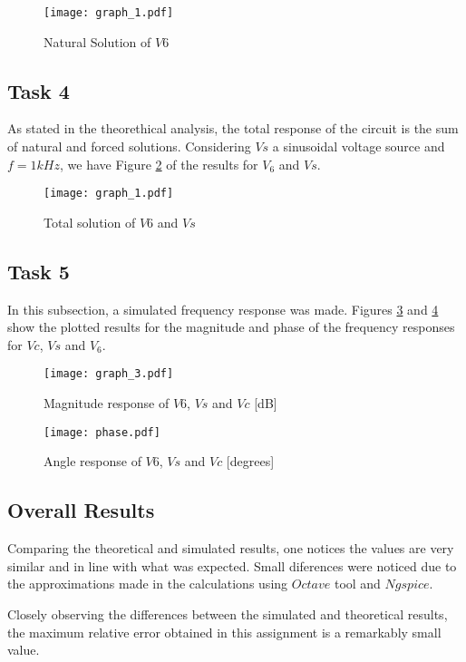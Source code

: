 \begin{figure}[h] \centering
\texttt{[image: graph\_1.pdf]}
\caption{Natural Solution of $V6$}
\label{fig:sr_3}
\end{figure}

\subsection{Task 4}
As stated in the theorethical analysis, the total response of the circuit is the sum of natural and forced solutions. Considering $Vs$ a sinusoidal voltage source and $f = 1kHz$, we have Figure \ref{fig:sr_4} of the results for $V_{6}$ and $Vs$.

\begin{figure}[h] \centering
\texttt{[image: graph\_1.pdf]}
\caption{Total solution of $V6$ and $Vs$}
\label{fig:sr_4}
\end{figure}

\subsection{Task 5}
In this subsection, a simulated frequency response was made. Figures \ref{fig:sr_5_1} and \ref{fig:sr_5_2} show the plotted results for the magnitude and phase of the frequency responses for $Vc$, $Vs$ and $V_{6}$.

\begin{figure}[h] \centering
\texttt{[image: graph\_3.pdf]}
\caption{Magnitude response of $V6$, $Vs$ and $Vc$ [dB]}
\label{fig:sr_5_1}
\end{figure}

\begin{figure}[h] \centering
\texttt{[image: phase.pdf]}
\caption{Angle response of $V6$, $Vs$ and $Vc$ [degrees]}
\label{fig:sr_5_2}
\end{figure}

\subsection{Overall Results}

Comparing the theoretical and simulated results, one notices the values are very similar and in line with what was expected. Small diferences were noticed due to the approximations made in the calculations using $Octave$ tool and $Ngspice$.

Closely observing the differences between the simulated and theoretical results, the maximum relative error obtained in this assignment is a remarkably small value.


